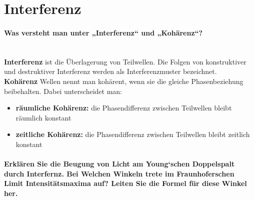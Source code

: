 \documentclass[a4paper, 11pt, ngerman, parskip=half-]{scrartcl}
\newcommand{\myparagraph}[1]{\paragraph{#1}\mbox{}\\}
\begin{document}
\section{Interferenz}

\myparagraph{Was versteht man unter „Interferenz“ und „Kohärenz“?}

\textbf{Interferenz} ist die Überlagerung von Teilwellen. Die Folgen von konstruktiver und destruktiver Interferenz werden als Interferenzmuster bezeichnet.\\
\textbf{Kohärenz} Wellen nennt man kohärent, wenn sie die gleiche Phasenbeziehung beibehalten. Dabei unterscheidet man:
\begin{itemize}
    \item \textbf{räumliche Kohärenz: } die Phasendifferenz zwischen Teilwellen bleibt räumlich konstant
    \item \textbf{zeitliche Kohärenz: } die Phasendifferenz zwischen Teilwellen bleibt zeitlich konstant
\end{itemize}

\myparagraph{Erklären Sie die Beugung von Licht am Young‘schen Doppelspalt durch Interfernz. Bei
    Welchen Winkeln trete im Fraunhoferschen Limit Intensitätsmaxima auf? Leiten Sie die
    Formel für diese Winkel her.}
\end{document}
